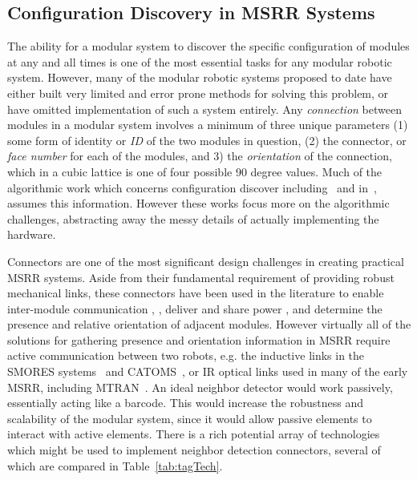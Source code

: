 \subsection{Configuration Discovery in MSRR Systems}
\label{ssec:RWconfiguration}
The ability for a modular system to discover the specific configuration of modules at any and all times is one of the most essential tasks for any modular robotic system. However, many of the modular robotic systems proposed to date have either built very limited and error prone methods for solving this problem, or have omitted implementation of such a system entirely. Any \textit{connection} between modules in a modular system involves a minimum of three unique parameters (1) some form of identity or \textit{ID} of the two modules in question, (2) the connector, or \textit{face number} for each of the modules, and 3) the \textit{orientation} of the connection, which in a cubic lattice is one of four possible 90 degree values. Much of the algorithmic work which concerns configuration discover including~\cite{park2008automatic} and in~\cite{Funiak-IJRR09}, assumes this information. However these works focus more on the algorithmic challenges, abstracting away the messy details of actually implementing the hardware.

Connectors are one of the most significant design challenges in creating practical MSRR systems. Aside from their fundamental requirement of providing robust mechanical links, these connectors have been used in the literature to enable inter-module communication \cite{liedke2013collective}, \cite{TosunDaveyLiuYim-IROS2016}, deliver and share power \cite{OptimalPowerSharing2016}, and determine the presence and relative orientation of adjacent modules. However virtually all of the solutions for gathering presence and orientation information in MSRR require active communication between two robots, e.g. the inductive links in the SMORES systems~\cite{TosunDaveyLiuYim-IROS2016} and CATOMS~\cite{Kirby-IROS07}, or IR optical links used in many of the early MSRR, including MTRAN~\cite{Kurokawa-IJRR08}. An ideal neighbor detector would work passively, essentially acting like a barcode. This would increase the robustness and scalability of the modular system, since it would allow passive elements to interact with active elements. There is a rich potential array of technologies which might be used to implement neighbor detection connectors, several of which are compared in Table~\ref{tab:tagTech}.

